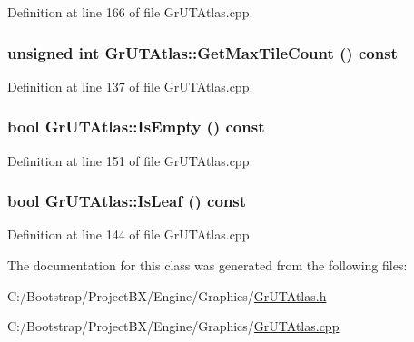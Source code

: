 Definition at line 166 of file GrUTAtlas.cpp.\hypertarget{class_gr_u_t_atlas_0600996694ae669b3e661b03e48ed002}{
\subsubsection[{GetMaxTileCount}]{\setlength{\rightskip}{0pt plus 5cm}unsigned int GrUTAtlas::GetMaxTileCount () const}}
\label{class_gr_u_t_atlas_0600996694ae669b3e661b03e48ed002}




Definition at line 137 of file GrUTAtlas.cpp.\hypertarget{class_gr_u_t_atlas_b2181198f45b057ad3776187e11b6bfe}{
\subsubsection[{IsEmpty}]{\setlength{\rightskip}{0pt plus 5cm}bool GrUTAtlas::IsEmpty () const}}
\label{class_gr_u_t_atlas_b2181198f45b057ad3776187e11b6bfe}




Definition at line 151 of file GrUTAtlas.cpp.\hypertarget{class_gr_u_t_atlas_51707ae21d8a5b2d4349b23ba4209651}{
\subsubsection[{IsLeaf}]{\setlength{\rightskip}{0pt plus 5cm}bool GrUTAtlas::IsLeaf () const}}
\label{class_gr_u_t_atlas_51707ae21d8a5b2d4349b23ba4209651}




Definition at line 144 of file GrUTAtlas.cpp.

The documentation for this class was generated from the following files:\begin{CompactItemize}
\item 
C:/Bootstrap/ProjectBX/Engine/Graphics/\hyperlink{_gr_u_t_atlas_8h}{GrUTAtlas.h}\item 
C:/Bootstrap/ProjectBX/Engine/Graphics/\hyperlink{_gr_u_t_atlas_8cpp}{GrUTAtlas.cpp}\end{CompactItemize}
